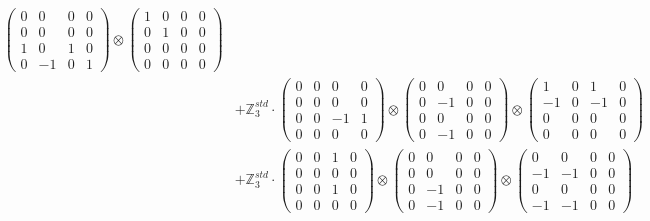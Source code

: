 \documentclass{article}
\begin{document}
{\begin{align}
            \begin{pmatrix} 0 & 0 & 0 & 0 \\ 0 & 0 & 0 & 0 \\ 1 & 0 & 1 & 0 \\ 0 & -1 & 0 & 1 \end{pmatrix} \otimes 
            \begin{pmatrix} 1 & 0 & 0 & 0 \\ 0 & 1 & 0 & 0 \\ 0 & 0 & 0 & 0 \\ 0 & 0 & 0 & 0 \end{pmatrix} \\ 
        &+ \label{Rs1-Rc16-Solution-6-c10} \mathbb{Z}_3^{std} \cdot 
            \begin{pmatrix} 0 & 0 & 0 & 0 \\ 0 & 0 & 0 & 0 \\ 0 & 0 & -1 & 1 \\ 0 & 0 & 0 & 0 \end{pmatrix} \otimes 
            \begin{pmatrix} 0 & 0 & 0 & 0 \\ 0 & -1 & 0 & 0 \\ 0 & 0 & 0 & 0 \\ 0 & -1 & 0 & 0 \end{pmatrix} \otimes 
            \begin{pmatrix} 1 & 0 & 1 & 0 \\ -1 & 0 & -1 & 0 \\ 0 & 0 & 0 & 0 \\ 0 & 0 & 0 & 0 \end{pmatrix} \\ 
        &+ \label{Rs1-Rc16-Solution-6-c11} \mathbb{Z}_3^{std} \cdot 
            \begin{pmatrix} 0 & 0 & 1 & 0 \\ 0 & 0 & 0 & 0 \\ 0 & 0 & 1 & 0 \\ 0 & 0 & 0 & 0 \end{pmatrix} \otimes 
            \begin{pmatrix} 0 & 0 & 0 & 0 \\ 0 & 0 & 0 & 0 \\ 0 & -1 & 0 & 0 \\ 0 & -1 & 0 & 0 \end{pmatrix} \otimes 
            \begin{pmatrix} 0 & 0 & 0 & 0 \\ -1 & -1 & 0 & 0 \\ 0 & 0 & 0 & 0 \\ -1 & -1 & 0 & 0 \end{pmatrix} \\ 

\end{align}}
\end{document}
